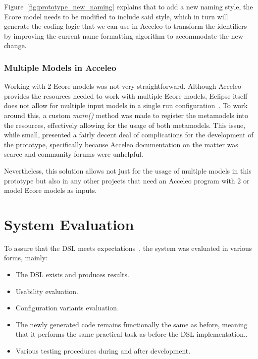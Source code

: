 Figure~\ref{fig:prototype_new_naming} explains that to add a new naming style, the Ecore model needs to be modified to include said style, which in turn will generate the coding logic that we can use in Acceleo to transform the \glspl{identifier} by improving the current name formatting algorithm to accommodate the new change.

\subsubsection{Multiple Models in Acceleo}

Working with 2 Ecore models was not very straightforward. Although Acceleo provides the resources needed to work with multiple Ecore models, Eclipse itself does not allow for multiple input models in a single run configuration~\cite{acceleo_multi_model_problem}. To work around this, a custom \textit{main()} method was made to register the \glspl{metamodel} into the resources, effectively allowing for the usage of both \glspl{metamodel}. This issue, while small, presented a fairly decent deal of complications for the development of the prototype, specifically because Acceleo documentation on the matter was scarce and community forums were unhelpful.

Nevertheless, this solution allows not just for the usage of multiple models in this prototype but also in any other projects that need an Acceleo program with 2 or model Ecore models as inputs.


\section{System Evaluation}
\label{sec:sys_eval}

To assure that the \gls{DSL} meets expectations~\cite{Voelter_Benz_2013}, the system was evaluated in various forms, mainly:

\begin{itemize}
	\item The \gls{DSL} exists and produces results.
	\item Usability evaluation.
	\item Configuration variants evaluation.
	\item The newly generated code remains functionally the same as before, meaning that it performs the same practical task as before the \gls{DSL} implementation..
	\item Various testing procedures during and after development.
\end{itemize}

